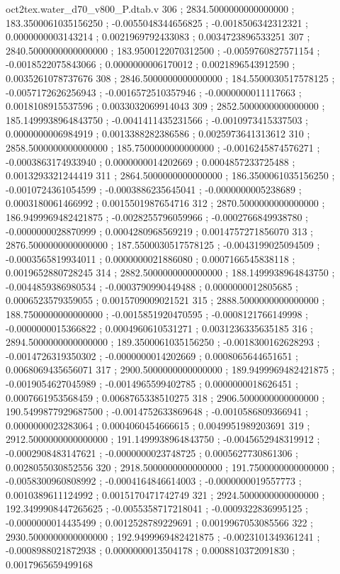 \begin{filecontents}[overwrite]{oct2tex.water_d70_v800_P.dtab.v}
306 ; 2834.5000000000000000 ; 183.3500061035156250 ; -0.0055048344656825 ; -0.0018506342312321 ; 0.0000000003143214 ; 0.0021969792433083 ; 0.0034723896533251
307 ; 2840.5000000000000000 ; 183.9500122070312500 ; -0.0059760827571154 ; -0.0018522075843066 ; 0.0000000006170012 ; 0.0021896543912590 ; 0.0035261078737676
308 ; 2846.5000000000000000 ; 184.5500030517578125 ; -0.0057172626256943 ; -0.0016572510357946 ; -0.0000000011117663 ; 0.0018108915537596 ; 0.0033032069914043
309 ; 2852.5000000000000000 ; 185.1499938964843750 ; -0.0041411435231566 ; -0.0010973415337503 ; 0.0000000006984919 ; 0.0013388282386586 ; 0.0025973641313612
310 ; 2858.5000000000000000 ; 185.7500000000000000 ; -0.0016245874576271 ; -0.0003863174933940 ; 0.0000000014202669 ; 0.0004857233725488 ; 0.0013293321244419
311 ; 2864.5000000000000000 ; 186.3500061035156250 ; -0.0010724361054599 ; -0.0003886235645041 ; -0.0000000005238689 ; 0.0003180061466992 ; 0.0015501987654716
312 ; 2870.5000000000000000 ; 186.9499969482421875 ; -0.0028255796059966 ; -0.0002766849938780 ; -0.0000000028870999 ; 0.0004280968569219 ; 0.0014757271856070
313 ; 2876.5000000000000000 ; 187.5500030517578125 ; -0.0043199025094509 ; -0.0003565819934011 ; 0.0000000021886080 ; 0.0007166545838118 ; 0.0019652880728245
314 ; 2882.5000000000000000 ; 188.1499938964843750 ; -0.0044859386980534 ; -0.0003790990449488 ; 0.0000000012805685 ; 0.0006523579359055 ; 0.0015709009021521
315 ; 2888.5000000000000000 ; 188.7500000000000000 ; -0.0015851920470595 ; -0.0008121766149998 ; -0.0000000015366822 ; 0.0004960610531271 ; 0.0031236335635185
316 ; 2894.5000000000000000 ; 189.3500061035156250 ; -0.0018300162628293 ; -0.0014726319350302 ; -0.0000000014202669 ; 0.0008065644651651 ; 0.0068069435656071
317 ; 2900.5000000000000000 ; 189.9499969482421875 ; -0.0019054627045989 ; -0.0014965599402785 ; 0.0000000018626451 ; 0.0007661953568459 ; 0.0068765338510275
318 ; 2906.5000000000000000 ; 190.5499877929687500 ; -0.0014752633869648 ; -0.0010586809366941 ; 0.0000000023283064 ; 0.0004060454666615 ; 0.0049951989203691
319 ; 2912.5000000000000000 ; 191.1499938964843750 ; -0.0045652948319912 ; -0.0002908483147621 ; -0.0000000023748725 ; 0.0005627730861306 ; 0.0028055030852556
320 ; 2918.5000000000000000 ; 191.7500000000000000 ; -0.0058300960808992 ; -0.0004164846614003 ; -0.0000000019557773 ; 0.0010389611124992 ; 0.0015170471742749
321 ; 2924.5000000000000000 ; 192.3499908447265625 ; -0.0055358717218041 ; -0.0009322836995125 ; -0.0000000014435499 ; 0.0012528789229691 ; 0.0019967053085566
322 ; 2930.5000000000000000 ; 192.9499969482421875 ; -0.0023101349361241 ; -0.0008988021872938 ; 0.0000000013504178 ; 0.0008810372091830 ; 0.0017965659499168

\end{filecontents}
